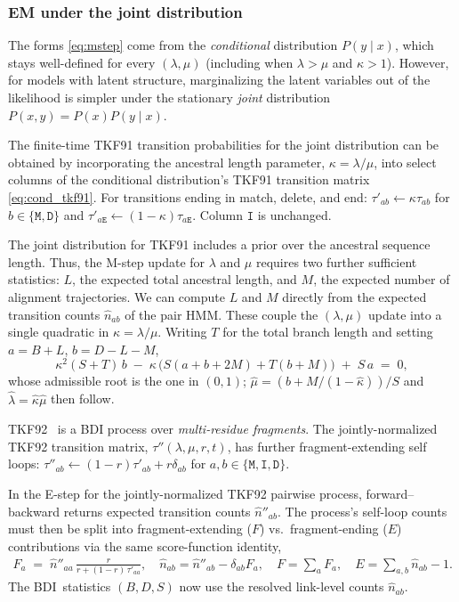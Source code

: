 \documentclass[11pt]{article}
\newcommand{\BDI}{\textsc{BDI}}
\newcommand{\ins}{\lambda}
\newcommand{\del}{\mu}
\newcommand{\ext}{r}
\newcommand{\hst}[1]{\texttt{#1}}
\begin{document}
\subsubsection{EM under the joint distribution}

The forms \eqref{eq:mstep} come from the \emph{conditional} distribution
$P(y\mid x)$, which stays well-defined for every $(\ins,\del)$
(including when $\ins{>}\del$ and $\kappa{>}1$).
However, for models with latent structure, marginalizing the latent 
variables out of the likelihood is simpler under the stationary 
\emph{joint} distribution $P(x,y)=P(x)P(y\mid x)$.

The finite-time TKF91 transition probabilities for the joint distribution can be 
obtained by incorporating the ancestral length parameter, $\kappa=\ins/\del$, 
into select columns of the conditional distribution's TKF91 transition matrix 
\eqref{eq:cond_tkf91}. For transitions ending in match, delete, and end:
$\tau'_{ab} \leftarrow \kappa \tau_{ab}$ for $b\in\{\hst{M},\hst{D}\}$ and $\tau'_{a \hst{E}} \leftarrow (1-\kappa)\tau_{a \hst{E}}$.
Column $\hst{I}$ is unchanged.

The joint distribution for TKF91 includes a prior over the ancestral sequence length. 
Thus, the M-step update for $\lambda$ and $\mu$ requires two further sufficient statistics: $L$, the
expected total ancestral length, and $M$, the expected number of
alignment trajectories. 
We can compute $L$ and $M$ directly from the expected transition counts $\hat n_{ab}$ of the pair HMM.
These couple the $(\ins,\del)$ update into a
single quadratic in $\kappa=\ins/\del$.
Writing $T$ for the total branch length and setting
$a=B+L$, $b=D-L-M$,
\begin{equation}
	\label{eq:kappa-quadratic}
	\kappa^2 (S+T)\,b \;-\; \kappa\,\bigl(S(a+b+2M)+T(b+M)\bigr) \;+\; S\,a \;=\; 0,
\end{equation}
whose admissible root is the one in $(0,1)$;
$\hat\del=(b+M/(1-\hat\kappa))/S$ and $\hat\ins=\hat\kappa\hat\del$ then
follow. 

TKF92~\citep{ThorneEtAl92} is a BDI process over \textit{multi-residue fragments}. The jointly-normalized TKF92 transition matrix, $\tau''(\ins,\del,\ext,t)$, has further fragment-extending self loops:
$\tau''_{ab} \leftarrow (1-\ext)\tau'_{ab} + \ext \delta_{ab}$ for $a,b \in \{ \hst{M}, \hst{I}, \hst{D} \}$.

In the E-step for the jointly-normalized TKF92 pairwise process, forward--backward returns expected transition counts $\hat n''_{ab}$. The process's self-loop counts must then
be split into fragment-extending ($F$) vs.\ fragment-ending ($E$) contributions via the same
score-function identity,
\begin{equation}
\label{eq:resolve}
\begin{gathered}
F_a \;=\; \hat n''_{aa}\,\frac{\ext}{\ext+(1-\ext)\,\tau'_{aa}},\quad
\hat n_{ab} = \hat n''_{ab}-\delta_{ab}F_a,\quad
F = \sum_a F_a,\quad
E = \sum_{a,b}\hat n_{ab} - 1.
\end{gathered}
\end{equation}
The \BDI\ statistics $(B,D,S)$ now use the resolved link-level counts $\hat n_{ab}$.
\end{document}
